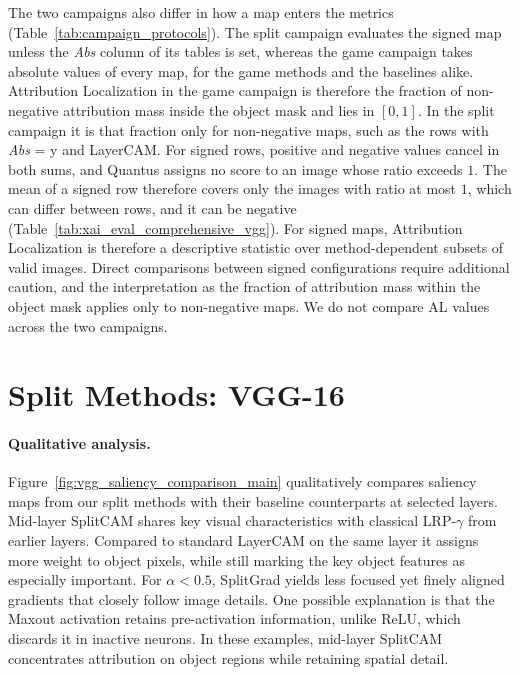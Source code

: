 The two campaigns also differ in how a map enters the metrics (Table~\ref{tab:campaign_protocols}). The split campaign evaluates the signed map unless the \emph{Abs} column of its tables is set, whereas the game campaign takes absolute values of every map, for the game methods and the baselines alike. Attribution Localization in the game campaign is therefore the fraction of non-negative attribution mass inside the object mask and lies in $[0,1]$. In the split campaign it is that fraction only for non-negative maps, such as the rows with \emph{Abs} = y and LayerCAM. For signed rows, positive and negative values cancel in both sums, and Quantus assigns no score to an image whose ratio exceeds $1$. The mean of a signed row therefore covers only the images with ratio at most $1$, which can differ between rows, and it can be negative (Table~\ref{tab:xai_eval_comprehensive_vgg}). For signed maps, Attribution Localization is therefore a descriptive statistic over method-dependent subsets of valid images. Direct comparisons between signed configurations require additional caution, and the interpretation as the fraction of attribution mass within the object mask applies only to non-negative maps. We do not compare AL values across the two campaigns.

\section{Split Methods: VGG-16}\label{sec:results_vgg}



\paragraph{Qualitative analysis.}
Figure~\ref{fig:vgg_saliency_comparison_main} qualitatively compares saliency maps from our split methods with their baseline counterparts at selected layers. Mid-layer SplitCAM shares key visual characteristics with classical LRP-$\gamma$ from earlier layers. Compared to standard LayerCAM on the same layer it assigns more weight to object pixels, while still marking the key object features as especially important. For $\alpha < 0.5$, SplitGrad yields less focused yet finely aligned gradients that closely follow image details. One possible explanation is that the Maxout activation retains pre-activation information, unlike ReLU, which discards it in inactive neurons. In these examples, mid-layer SplitCAM concentrates attribution on object regions while retaining spatial detail.

